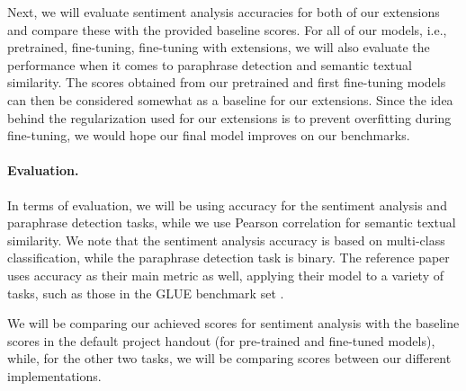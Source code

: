 \documentclass{article}
\begin{document}
Next, we will evaluate sentiment analysis accuracies for both of our extensions and compare these with the provided baseline scores. For all of our models, i.e., pretrained, fine-tuning, fine-tuning with extensions, we will also evaluate the performance when it comes to paraphrase detection and semantic textual similarity. The scores obtained from our pretrained and first fine-tuning models can then be considered somewhat as a baseline for our extensions. Since the idea behind the regularization used for our extensions is to prevent overfitting during fine-tuning, we would hope our final model improves on our benchmarks.

\paragraph{Evaluation.}
In terms of evaluation, we will be using accuracy for the sentiment analysis and paraphrase detection tasks, while we use Pearson correlation for semantic textual similarity. We note that the sentiment analysis accuracy is based on multi-class classification, while the paraphrase detection task is binary. The reference paper uses accuracy as their main metric as well, applying their model to a variety of tasks, such as those in the GLUE benchmark set \cite{wang2018glue}.

We will be comparing our achieved scores for sentiment analysis with the baseline scores in the default project handout (for pre-trained and fine-tuned models), while, for the other two tasks, we will be comparing scores between our different implementations.




\end{document}
